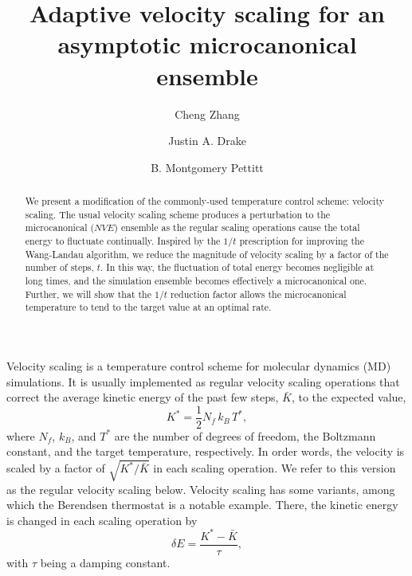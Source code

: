 \documentclass[reprint]{revtex4-1}
\begin{document}
\title{Adaptive velocity scaling for an asymptotic
microcanonical ensemble}

\author{Cheng Zhang}
\author{Justin A. Drake}
\author{B. Montgomery Pettitt}

\begin{abstract}
  We present a modification of the commonly-used
  temperature control scheme: velocity scaling.
  The usual velocity scaling scheme produces a perturbation to
  the microcanonical ($NVE$) ensemble
  as the regular scaling operations cause the total energy to fluctuate continually.
  Inspired by the $1/t$ prescription for improving the Wang-Landau algorithm,
  we reduce
  the magnitude of velocity scaling
  by a factor of the number of steps, $t$.
  In this way,
  the fluctuation of total energy becomes negligible at long times,
  and the simulation ensemble becomes effectively
  a microcanonical one.
  Further, we will show that the $1/t$ reduction factor
  allows the microcanonical temperature to tend to the target value
  at an optimal rate.
\end{abstract}

\maketitle



Velocity scaling is a temperature control scheme
for molecular dynamics (MD) simulations.
%
It is usually implemented as
regular velocity scaling operations
that correct the average
kinetic energy of the past few steps, $\bar K$,
to the expected value\cite{frenkel, haile},
%
\begin{equation}
  K^* = \frac{1}{2} N_f \, k_B \, T^*
  ,
  \label{eq:K_canon}
\end{equation}
%
where $N_f$, $k_B$, and $T^*$ are the number of degrees of freedom,
the Boltzmann constant, and the target temperature, respectively.
%
In order words,
the velocity is scaled by a factor of
$\sqrt{ K^* / \bar K }$
in each scaling operation.
%
We refer to this version as the regular velocity scaling below.
%
Velocity scaling has some variants,
among which
the Berendsen thermostat\cite{berendsen1984}
is a notable example.
%
There,
the kinetic energy is changed in each scaling operation
by
%
\begin{equation}
  \delta E = \frac{ K^* - \bar K } { \tau },
  \label{eq:Berendsen}
\end{equation}
%
with $\tau$ being a damping constant.
\end{document}
